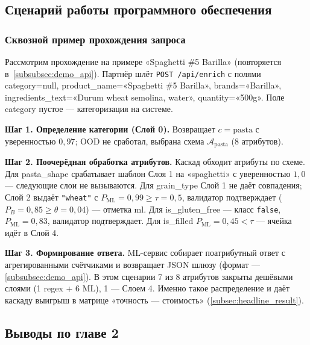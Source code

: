 \subsection{Сценарий работы программного обеспечения}
\label{subsec:scenario}

\subsubsection{Сквозной пример прохождения запроса}

Рассмотрим прохождение на примере «Spaghetti \#5 Barilla» (повторяется в~\ref{subsubsec:demo_api}). Партнёр шлёт \texttt{POST /api/enrich} с полями category=null, product\_name=«Spaghetti \#5 Barilla», brands=«Barilla», ingredients\_text=«Durum wheat semolina, water», quantity=«500g». Поле category пустое — категоризация на системе.

\textbf{Шаг 1. Определение категории (Слой 0).} Возвращает $c = \text{pasta}$ с уверенностью $0{,}97$; OOD не сработал, выбрана схема $\mathcal{A}_{\text{pasta}}$ (8 атрибутов).

\textbf{Шаг 2. Поочерёдная обработка атрибутов.} Каскад обходит атрибуты по схеме. Для pasta\_shape срабатывает шаблон Слоя 1 на «spaghetti» с уверенностью $1{,}0$ — следующие слои не вызываются. Для grain\_type Слой 1 не даёт совпадения; Слой 2 выдаёт \texttt{"wheat"} с $P_{\text{ML}} = 0{,}99 \geq \tau = 0{,}5$, валидатор подтверждает ($P_B = 0{,}85 \geq \theta = 0{,}04$) — отметка ml. Для is\_gluten\_free — класс \texttt{false}, $P_{\text{ML}} = 0{,}83$, валидатор подтверждает. Для is\_filled $P_{\text{ML}} = 0{,}45 < \tau$ — ячейка идёт в Слой 4.

\textbf{Шаг 3. Формирование ответа.} ML-сервис собирает поатрибутный ответ с агрегированными счётчиками и возвращает JSON шлюзу (формат — \ref{subsubsec:demo_api}). В этом сценарии 7 из 8 атрибутов закрыты дешёвыми слоями (1 regex + 6 ML), 1 — Слоем 4. Именно такое распределение и даёт каскаду выигрыш в матрице «точность — стоимость» (\ref{subsec:headline_result}).

\subsection{Выводы по главе 2}

